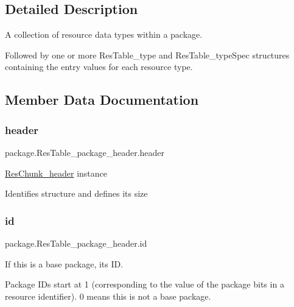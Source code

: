 \subsection{Detailed Description}
A collection of resource data types within a package. 

Followed by one or more Res\+Table\+\_\+type and Res\+Table\+\_\+type\+Spec structures containing the entry values for each resource type. 

\subsection{Member Data Documentation}
\mbox{\label{classpackage_1_1ResTable__package__header_a6de11850cfa30e936ae7b0c6b0c852c2}} 
\subsubsection{\texorpdfstring{header}{header}}
{\footnotesize\ttfamily package.\+Res\+Table\+\_\+package\+\_\+header.\+header}



\mbox{\hyperlink{}{Res\+Chunk\+\_\+header}} instance 

Identifies structure and defines its size \mbox{\label{classpackage_1_1ResTable__package__header_a2726e7fc9dac06c2ff225fbab0a896d2}} 
\subsubsection{\texorpdfstring{id}{id}}
{\footnotesize\ttfamily package.\+Res\+Table\+\_\+package\+\_\+header.\+id}



If this is a base package, its ID. 

Package I\+Ds start at 1 (corresponding to the value of the package bits in a resource identifier). 0 means this is not a base package. \mbox{\label{classpackage_1_1ResTable__package__header_a343dde2c971c41ce8362aedf4d87118f}} 
